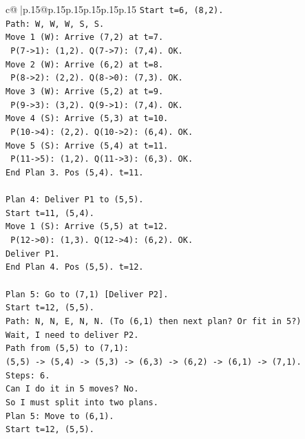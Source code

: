 \documentclass{article}
\begin{document}
{\begin{supertabular}{c@{$\;$}|p{.15\linewidth}@{}p{.15\linewidth}p{.15\linewidth}p{.15\linewidth}p{.15\linewidth}p{.15\linewidth}}
{{{\texttt{Start t=6, (8,2).} \\
\texttt{Path: W, W, W, S, S.} \\
\texttt{Move 1 (W): Arrive (7,2) at t=7.} \\
\texttt{  P(7{-}>1): (1,2). Q(7{-}>7): (7,4). OK.} \\
\texttt{Move 2 (W): Arrive (6,2) at t=8.} \\
\texttt{  P(8{-}>2): (2,2). Q(8{-}>0): (7,3). OK.} \\
\texttt{Move 3 (W): Arrive (5,2) at t=9.} \\
\texttt{  P(9{-}>3): (3,2). Q(9{-}>1): (7,4). OK.} \\
\texttt{Move 4 (S): Arrive (5,3) at t=10.} \\
\texttt{  P(10{-}>4): (2,2). Q(10{-}>2): (6,4). OK.} \\
\texttt{Move 5 (S): Arrive (5,4) at t=11.} \\
\texttt{  P(11{-}>5): (1,2). Q(11{-}>3): (6,3). OK.} \\
\texttt{End Plan 3. Pos (5,4). t=11.} \\
\\ 
\texttt{Plan 4: Deliver P1 to (5,5).} \\
\texttt{Start t=11, (5,4).} \\
\texttt{Move 1 (S): Arrive (5,5) at t=12.} \\
\texttt{  P(12{-}>0): (1,3). Q(12{-}>4): (6,2). OK.} \\
\texttt{Deliver P1.} \\
\texttt{End Plan 4. Pos (5,5). t=12.} \\
\\ 
\texttt{Plan 5: Go to (7,1) {[}Deliver P2{]}.} \\
\texttt{Start t=12, (5,5).} \\
\texttt{Path: N, N, E, N, N. (To (6,1) then next plan? Or fit in 5?)} \\
\texttt{Wait, I need to deliver P2.} \\
\texttt{Path from (5,5) to (7,1):} \\
\texttt{(5,5) {-}> (5,4) {-}> (5,3) {-}> (6,3) {-}> (6,2) {-}> (6,1) {-}> (7,1).} \\
\texttt{Steps: 6.} \\
\texttt{Can I do it in 5 moves? No.} \\
\texttt{So I must split into two plans.} \\
\texttt{Plan 5: Move to (6,1).} \\
\texttt{Start t=12, (5,5).} \\
}}}
\end{supertabular}}
\end{document}
